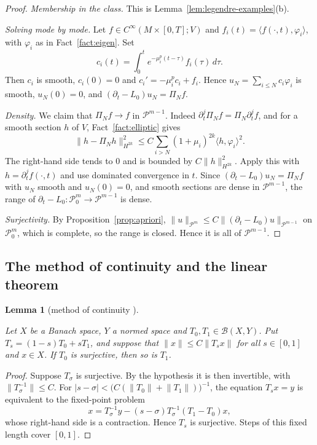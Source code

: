 \documentclass[11pt,reqno]{amsart}
\newtheorem{lemma}[theorem]{Lemma}
\theoremstyle{definition}
\theoremstyle{remark}
\newcommand{\Pp}{\mathcal{P}}
\newcommand{\ip}[2]{\langle #1,#2\rangle}
\newcommand{\norm}[1]{\lVert #1\rVert}
\newcommand{\abs}[1]{\lvert #1\rvert}
\newcommand{\lean}[1]{}
\newcommand{\uses}[1]{}
\numberwithin{equation}{section}
\begin{document}
\begin{proof}
\uses{lem:legendre-examples, fact:eigen, fact:elliptic, prop:apriori}
\emph{Membership in the class.} This is Lemma~\ref{lem:legendre-examples}(b).

\emph{Solving mode by mode.} Let $f\in C^\infty(M\times[0,T];V)$ and $f_i(t)=\ip{f(\cdot,t)}{\varphi_i}$,
with $\varphi_i$ as in Fact~\ref{fact:eigen}. Set
\[
  c_i(t)=\int_0^te^{-\mu_i^p(t-\tau)}f_i(\tau)\,d\tau .
\]
Then $c_i$ is smooth, $c_i(0)=0$ and $c_i'=-\mu_i^pc_i+f_i$. Hence $u_N=\sum_{i\le N}c_i\varphi_i$ is
smooth, $u_N(0)=0$, and $(\partial_t-L_0)u_N=\Pi_Nf$.

\emph{Density.} We claim that $\Pi_Nf\to f$ in $\Pp^{m-1}$. Indeed $\partial_t^j\Pi_Nf=\Pi_N\partial_t^jf$, and for a
smooth section $h$ of $V$, Fact~\ref{fact:elliptic} gives
\[
  \norm{h-\Pi_Nh}_{H^{2k}}^2\le C\sum_{i>N}(1+\mu_i)^{2k}\ip{h}{\varphi_i}^2 .
\]
The right-hand side tends to $0$ and is bounded by $C\norm h_{H^{2k}}^2$. Apply this with
$h=\partial_t^jf(\cdot,t)$ and use dominated convergence in $t$. Since $(\partial_t-L_0)u_N=\Pi_Nf$
with $u_N$ smooth and $u_N(0)=0$, and smooth sections are dense in $\Pp^{m-1}$, the range of
$\partial_t-L_0\colon\Pp^m_0\to\Pp^{m-1}$ is dense.

\emph{Surjectivity.} By Proposition~\ref{prop:apriori}, $\norm u_{\Pp^m}\le C\norm{(\partial_t-L_0)u}_{\Pp^{m-1}}$
on $\Pp^m_0$, which is complete, so the range is closed. Hence it is all of $\Pp^{m-1}$.
\end{proof}

\subsection{The method of continuity and the linear theorem}

\begin{lemma}[method of continuity {\cite[Thm.~5.2]{GT}}]\label{lem:continuity}
\lean{ShortTime.surjective_of_continuity}
Let $X$ be a Banach space, $Y$ a normed space and $T_0,T_1\in\mathcal B(X,Y)$. Put
$T_s=(1-s)T_0+sT_1$, and suppose that $\norm x\le C\norm{T_sx}$ for all $s\in[0,1]$ and $x\in X$. If
$T_0$ is surjective, then so is $T_1$.
\end{lemma}

\begin{proof}
Suppose $T_\sigma$ is surjective. By the hypothesis it is then invertible, with
$\norm{T_\sigma^{-1}}\le C$. For $\abs{s-\sigma}<\bigl(C(\norm{T_0}+\norm{T_1})\bigr)^{-1}$, the
equation $T_sx=y$ is equivalent to the fixed-point problem
\[
  x=T_\sigma^{-1}y-(s-\sigma)T_\sigma^{-1}(T_1-T_0)x,
\]
whose right-hand side is a contraction. Hence $T_s$ is surjective. Steps of this fixed length cover
$[0,1]$.
\end{proof}
\end{document}
